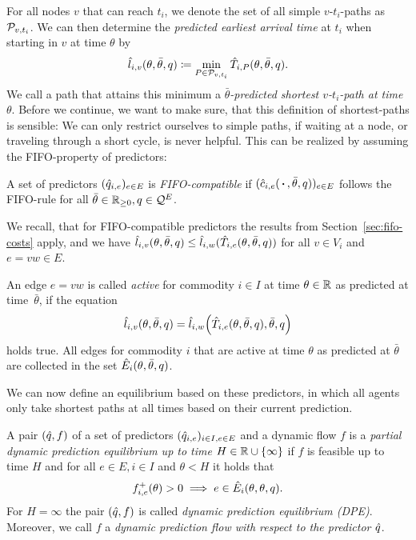 For all nodes $v$ that can reach $t_i$, we denote the set of all simple $v$-$t_i$-paths as $\mathcal{P}_{v,t_i}$.
We can then determine the \emph{predicted earliest arrival time} at $t_i$ when starting in $v$ at time $\theta$ by
\[
    \hat l_{i,v}(\theta, \bar\theta, q) \coloneqq \min_{P \in \mathcal{P}_{v,t_i}} \hat T_{i, P}(\theta,\bar\theta, q).
\]
We call a path that attains this minimum a \emph{$\bar\theta$-predicted shortest $v$-$t_i$-path at time $\theta$}.
Before we continue, we want to make sure, that this definition of shortest-paths is sensible:
We can only restrict ourselves to simple paths, if waiting at a node, or traveling through a short cycle, is never helpful.
This can be realized by assuming the FIFO-property of predictors:
\begin{definition}
    A set of predictors $(\hat q_{i,e})_{e\in E}$ is \emph{FIFO-compatible} if $(\hat c_{i,e}(\,\boldsymbol{\cdot}\,, \bar\theta, q))_{e\in E}$ follows the FIFO-rule for all $\bar\theta\in\mathbb{R}_{\geq0}, q\in\mathcal{Q}^E$.
\end{definition}

We recall, that for FIFO-compatible predictors the results from Section~\ref{sec:fifo-costs} apply, and we have $\hat l_{i,v}(\theta, \bar\theta, q) \leq \hat l_{i,w}{(
    \hat T_{i, e}(\theta, \bar\theta, q)
)}$
for all $v\in V_i$ and $e=vw\in E$.

\begin{definition}
An edge $e=vw$ is called \emph{active} for commodity $i\in I$ at time $\theta\in\mathbb{R}$ as predicted at time~$\bar\theta$, if the equation \[
    \hat l_{i,v}(\theta, \bar\theta, q) = \hat l_{i,w}{\left(
        \hat T_{i, e}(\theta, \bar\theta, q), \bar\theta, q
    \right)}
\]
holds true.
All edges for commodity $i$ that are active at time $\theta$ as predicted at $\bar\theta$ are collected in the set $\hat E_i(\theta, \bar\theta, q)$. 
\end{definition}

We can now define an equilibrium based on these predictors, in which all agents only take shortest paths at all times based on their current prediction.
\begin{definition}
    A pair $(\hat q, f)$ of a set of predictors $(\hat q_{i,e})_{i\in I, e\in E}$ and a dynamic flow $f$ is a \emph{partial dynamic prediction equilibrium up to time $H\in\mathbb{R}\cup\{\infty\}$} if $f$ is feasible up to time $H$ and for all $e\in E, i\in I$ and $\theta < H$ it holds that
    \[
        {f}^+_{i,e}(\theta) > 0 \implies e \in \hat E_i(\theta, \theta, q).
    \]
    For $H = \infty$ the pair $(\hat q, f)$ is called \emph{dynamic prediction equilibrium (DPE)}. 
    Moreover, we call $f$ a \emph{dynamic prediction flow with respect to the predictor $\hat q$}.
\end{definition}

